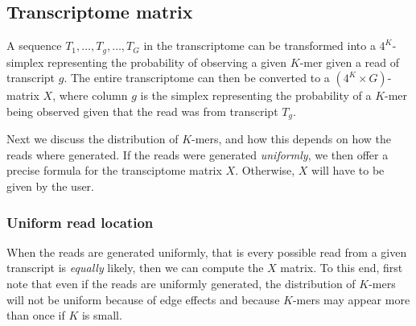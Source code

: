 \documentclass[11pt]{article}
\newcommand{\rob}[1]{\todo[inline]{\textbf{Robert: }#1}}
\begin{document}
\subsection{Transcriptome matrix}

A sequence $T_1, \ldots, T_g, \ldots, T_G$ in the transcriptome can be transformed into a
$4^K$-simplex representing the probability of observing a given
$K$-mer given a read of transcript $g$.  The entire transcriptome can
then be converted to a $(4^K \times G)$-matrix $X$, where column $g$ is the
simplex representing the probability of a $K$-mer being observed given
that the read was from transcript $T_g$.

Next we discuss the distribution of $K$-mers, and how this depends on how the reads where generated. If the reads were generated \emph{uniformly}, we 
then offer a precise formula for the transciptome matrix $X$. Otherwise, $X$ will have to be given by the user.


\subsubsection{Uniform read location}

When the reads are generated uniformly, that is every possible read from a given transcript is \emph{equally} likely, then we can compute the $X$ matrix.
To this end, first note that even if the reads are uniformly generated, the
distribution of $K$-mers will not be uniform because of edge effects
and because $K$-mers may appear more than once if $K$ is small.
\end{document}
